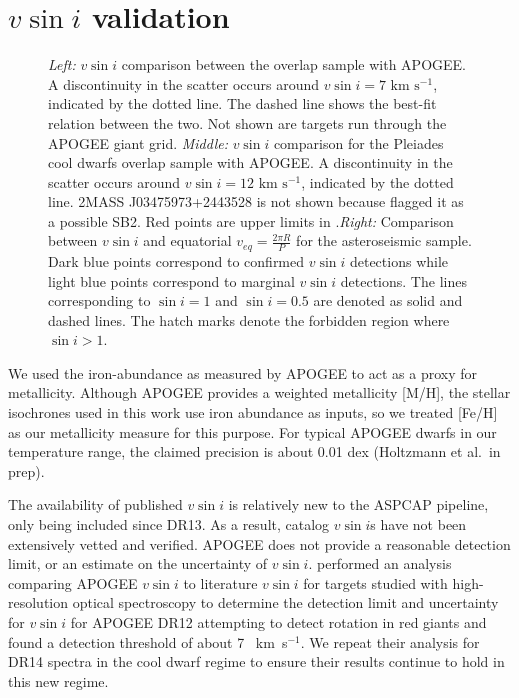 \documentclass[manuscript]{aastex6}
\newcommand{\vsini}{\ensuremath{v \sin i}}
\newcommand{\kms}{\textrm{~km~s}\ensuremath{^{-1}}}
\begin{document}
\section{\vsini{} validation}
\label{sec:vsini_check}

\begin{figure*}
    \caption{\emph{Left:} \vsini{} comparison between the \citet{Bruntt12}
        overlap sample with APOGEE\@. A discontinuity in the scatter occurs
        around \(\vsini = 7 \kms\), indicated by the dotted line. The dashed
    line shows the best-fit relation between the two. Not shown are targets 
    run through the APOGEE giant grid. \emph{Middle:} \vsini{} comparison for 
    the Pleiades cool dwarfs \citep{Stauffer87} overlap sample with APOGEE\@. 
    A discontinuity in the scatter occurs around \(\vsini = 12 \kms\), 
    indicated by the dotted line. 2MASS J03475973+2443528 is not shown
    because \citet{Stauffer87} flagged it as a possible SB2. Red points are 
    upper limits in \citet{Stauffer87}.\emph{Right:} Comparison between
    \vsini{} and equatorial \(v_{eq} = \frac{2\pi R}{P}\) for the 
    asteroseismic sample. Dark blue points correspond to confirmed
    \vsini{} detections while light blue points correspond to marginal
    \vsini{} detections. The lines corresponding to \(\sin i = 1\) and
    \(\sin i = 0.5\) are denoted as solid and dashed lines. The hatch
    marks denote the forbidden region where \(\sin i > 1\).\label{fig:comps}}
\end{figure*}



We used the iron-abundance as measured by APOGEE to act as a proxy for
metallicity. Although APOGEE provides a weighted metallicity [M/H], the 
stellar isochrones used in this work use iron abundance as inputs, so we 
treated [Fe/H] as our metallicity measure for this purpose. For typical APOGEE 
dwarfs in our temperature range, the claimed precision is about 0.01
dex (Holtzmann et al.\ in prep). 

The availability of published \vsini{} is relatively new to the ASPCAP pipeline, only
being included since DR13. As a result, catalog \vsini{}s have not been 
extensively vetted and verified. APOGEE does not provide a reasonable
detection limit, or an estimate on the uncertainty of \vsini{}. 
\citet{Tayar15} performed an analysis comparing APOGEE \vsini{} to literature
\vsini{} for targets studied with high-resolution optical spectroscopy to 
determine the detection limit and
uncertainty for \vsini{} for APOGEE DR12 attempting to detect rotation in red
giants and found a detection threshold of about 7 \kms. We repeat their 
analysis for DR14 spectra in the cool dwarf regime to ensure their results
continue to hold in this new regime. 
\end{document}

